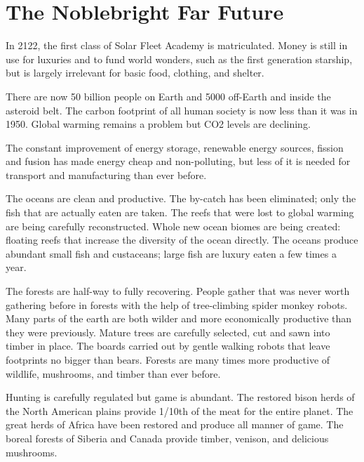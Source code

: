\documentclass[
	fontsize=10pt, %
	twoside=false, %
	secnumdepth=1, %
]{kaobook}
\begin{document}
\section{The Noblebright Far Future}


In 2122, the first class of Solar Fleet Academy is matriculated.
Money is still in use for luxuries and to fund world wonders,
such as the first generation starship, but is largely irrelevant
for basic food, clothing, and shelter.

There are now 50 billion people on Earth and 5000 off-Earth
and inside the asteroid belt. The carbon footprint of all human
society is now less than it was in 1950. Global warming
remains a problem but CO2 levels are declining.

The constant improvement of energy storage, renewable energy sources,
fission and fusion
has made energy cheap and non-polluting, but less of it is needed
for transport and manufacturing than ever before.

The oceans are clean and productive. The by-catch has been
eliminated; only the fish that are actually eaten are taken.
The reefs that were lost to global warming are being carefully
reconstructed.
Whole new ocean biomes are being created: floating reefs
that increase the diversity of the ocean directly.
The oceans produce abundant small fish and custaceans; large fish are luxury
eaten a few times a year.

The forests are half-way to fully recovering.
People gather that was never worth gathering before in forests
with the help of tree-climbing spider monkey robots.
Many parts
of the earth are both wilder and more economically productive than
they were previously.
Mature trees are carefully selected, cut and sawn into timber
in place.
The boards carried out by gentle walking robots that leave footprints
no bigger than bears.
Forests are many times more productive of wildlife, mushrooms, and timber
than ever before.


Hunting is carefully regulated but game is abundant.
The restored bison herds of the North American plains provide 1/10th of the meat
for the entire planet.
The great herds of Africa have been restored and produce all manner of game.
The boreal forests of Siberia and Canada provide timber,
venison, and delicious mushrooms.
\end{document}
